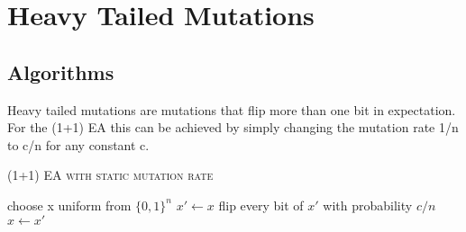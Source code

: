 \chapter{Heavy Tailed Mutations}\label{ch:heavyMut}

\section{Algorithms}
Heavy tailed mutations are mutations that flip more than one bit in expectation.
For the (1+1) EA this can be achieved by simply changing the mutation rate 1/n to c/n for any constant c.
\begin{algorithm}[bt]
      \caption{\textsc{(1+1) EA with static mutation rate}}\label{alg:EA_SM}

      \DontPrintSemicolon %

      \BlankLine
      choose x uniform from ${\{0,1\}}^n$\;
      {
      $x' \leftarrow x$\;
      flip every bit of $x'$ with probability $c/n$\;
      {
      {
            $x \leftarrow x'$\;
      }
      }
      }
\end{algorithm}


